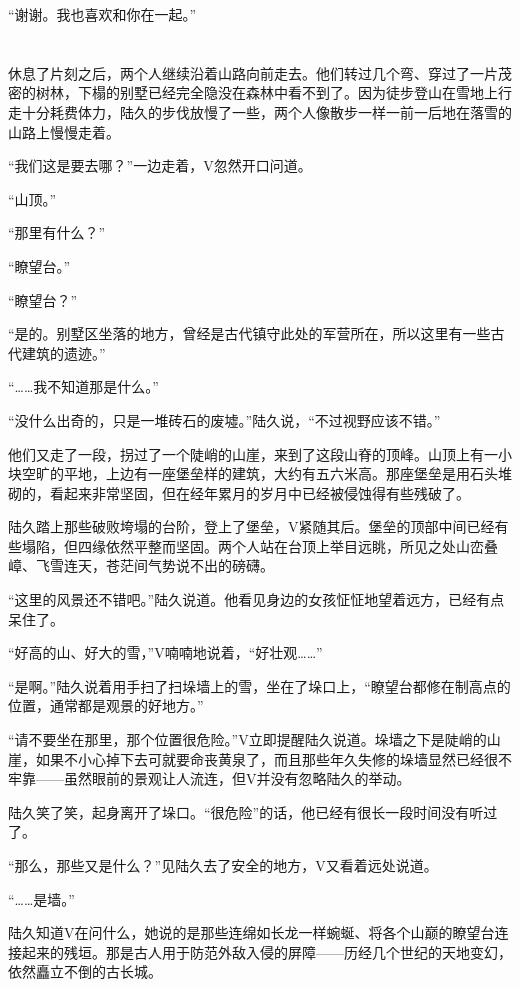 “谢谢。我也喜欢和你在一起。”

\section*{}

休息了片刻之后，两个人继续沿着山路向前走去。他们转过几个弯、穿过了一片茂密的树林，下榻的别墅已经完全隐没在森林中看不到了。因为徒步登山在雪地上行走十分耗费体力，陆久的步伐放慢了一些，两个人像散步一样一前一后地在落雪的山路上慢慢走着。

“我们这是要去哪？”一边走着，V忽然开口问道。

“山顶。”

“那里有什么？”

“瞭望台。”

“瞭望台？”

“是的。别墅区坐落的地方，曾经是古代镇守此处的军营所在，所以这里有一些古代建筑的遗迹。”

“……我不知道那是什么。”

“没什么出奇的，只是一堆砖石的废墟。”陆久说，“不过视野应该不错。”

他们又走了一段，拐过了一个陡峭的山崖，来到了这段山脊的顶峰。山顶上有一小块空旷的平地，上边有一座堡垒样的建筑，大约有五六米高。那座堡垒是用石头堆砌的，看起来非常坚固，但在经年累月的岁月中已经被侵蚀得有些残破了。

陆久踏上那些破败垮塌的台阶，登上了堡垒，V紧随其后。堡垒的顶部中间已经有些塌陷，但四缘依然平整而坚固。两个人站在台顶上举目远眺，所见之处山峦叠嶂、飞雪连天，苍茫间气势说不出的磅礴。

“这里的风景还不错吧。”陆久说道。他看见身边的女孩怔怔地望着远方，已经有点呆住了。

“好高的山、好大的雪，”V喃喃地说着，“好壮观……”

“是啊。”陆久说着用手扫了扫垛墙上的雪，坐在了垛口上，“瞭望台都修在制高点的位置，通常都是观景的好地方。”

“请不要坐在那里，那个位置很危险。”V立即提醒陆久说道。垛墙之下是陡峭的山崖，如果不小心掉下去可就要命丧黄泉了，而且那些年久失修的垛墙显然已经很不牢靠——虽然眼前的景观让人流连，但V并没有忽略陆久的举动。

陆久笑了笑，起身离开了垛口。“很危险”的话，他已经有很长一段时间没有听过了。

“那么，那些又是什么？”见陆久去了安全的地方，V又看着远处说道。

“……是墙。”

陆久知道V在问什么，她说的是那些连绵如长龙一样蜿蜒、将各个山巅的瞭望台连接起来的残垣。那是古人用于防范外敌入侵的屏障——历经几个世纪的天地变幻，依然矗立不倒的古长城。

